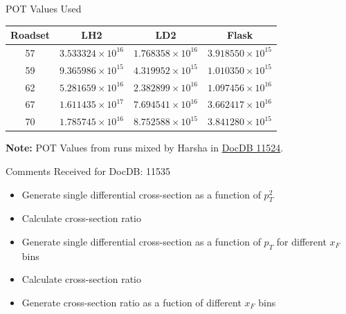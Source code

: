 \documentclass[aspectratio=169]{beamer}
\begin{document}
\begin{frame}{POT Values Used}
\begin{table}[H]
    \centering
    \renewcommand{\arraystretch}{1.3}
    \begin{tabular}{|c|c|c|c|}
        \hline
        \textbf{Roadset} & \textbf{LH2} & \textbf{LD2} & \textbf{Flask} \\ \hline
        57 & $3.533324 \times 10^{16}$ & $1.768358 \times 10^{16}$ & $3.918550 \times 10^{15}$ \\ \hline
        59 & $9.365986 \times 10^{15}$ & $4.319952 \times 10^{15}$ & $1.010350 \times 10^{15}$ \\ \hline
        62 & $5.281659 \times 10^{16}$ & $2.382899 \times 10^{16}$ & $1.097456 \times 10^{16}$ \\ \hline
        67 & $1.611435 \times 10^{17}$ & $7.694541 \times 10^{16}$ & $3.662417 \times 10^{16}$ \\ \hline
        70 & $1.785745 \times 10^{16}$ & $8.752588 \times 10^{15}$ & $3.841280 \times 10^{15}$ \\ \hline
    \end{tabular}
\end{table}
\vspace{0.3cm}
\footnotesize
\textbf{Note:} POT Values from runs mixed by Harsha in \href{https://seaquest-docdb.fnal.gov/cgi-bin/sso/ShowDocument?docid=11524}{DocDB 11524}.
\normalsize
\end{frame}
\begin{frame}{Comments Received for DocDB: 11535}
\begin{itemize}
    \item Generate single differential cross-section as a function of $p^{2}_{T}$
    \item Calculate cross-section ratio
    \item Generate single differential cross-section as a function of $p_{T}$ for different $x_{F}$ bins
    \item Calculate cross-section ratio
    \item Generate cross-section ratio as a fuction of different $x_F$ bins
\end{itemize}
\end{frame}
\end{document}
